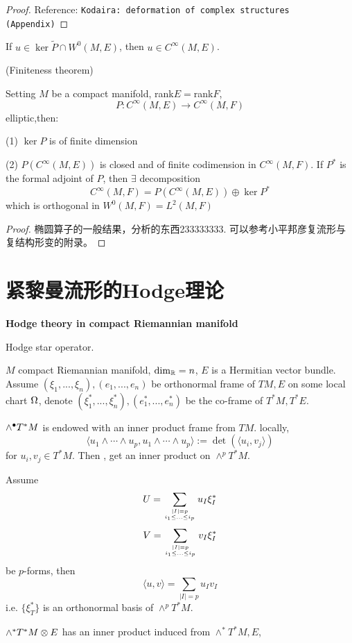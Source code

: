 \begin{proof}
Reference: \verb"Kodaira: deformation of complex structures (Appendix)"
\end{proof}

\begin{cor}
If $u\in\ker\tilde{P}\cap W^0(M,E)$, then $u\in C^\infty(M,E)$.
\end{cor}

\begin{lemma}(Finiteness theorem)

Setting $M$ be a compact manifold, rank$E=$rank$F$,
$$P:C^\infty(M,E)\to C^\infty(M,F)$$
elliptic,then:

(1) $\ker P$ is of finite dimension

(2) $P(C^\infty(M,E))$ is closed and of finite codimension in $C^\infty(M,F)$.
If $P^*$ is the formal adjoint of $P$, then $\exists$ decomposition
$$C^\infty(M,F)=P(C^\infty(M,E))\oplus\ker P^*$$
which is orthogonal in $W^0(M,F)=L^2(M,F)$
\end{lemma}
\begin{proof}
椭圆算子的一般结果，分析的东西233333333.
可以参考小平邦彦复流形与复结构形变的附录。
\end{proof}

\section{紧黎曼流形的Hodge理论}
\textbf{Hodge theory in compact Riemannian manifold}

Hodge star operator.

$M$ compact Riemannian manifold, $\dim_{\mathbb{R}}=n$, $E$ is a Hermitian vector bundle.
Assume $(\xi_1,...,\xi_n),(e_1,...,e_n)$ be orthonormal frame of $TM, E$
on some local chart $\Omega$, denote
$(\xi_1^*,...,\xi_n^*),(e_1^*,...,e_n^*)$ be the co-frame of
$T^*M,T^*E$.

$\wedge^{\bullet} T^*M$ is endowed with an inner product frame from $TM$.
locally,
$$\langle u_1\wedge\cdots\wedge u_p,
          u_1\wedge\cdots\wedge u_p\rangle
:=\det(\langle u_i,v_j\rangle)
$$
for $u_i,v_j\in T^*M$. Then , get an inner product on $\wedge^pT^*M$.

Assume
$$U=\sum_{|I|=p\atop i_1\leq...\leq i_p}
  u_I\xi_I^*
$$
$$V=\sum_{|I|=p\atop i_1\leq...\leq i_p}
  v_I\xi_I^*
$$
be $p$-forms, then
$$\langle u,v\rangle=\sum_{|I|=p}u_Iv_I$$
i.e. $\{\xi^*_T\}$ is an orthonormal basis of $\wedge^pT^*M$.

$\wedge^*T^*M\otimes E$ has an inner product induced from $\wedge^*T^*M,E$,

